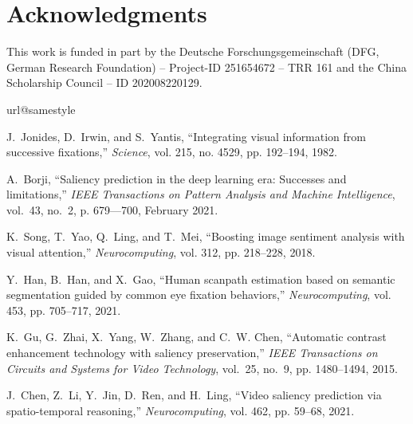 \documentclass{article}
\begin{document}
\section{Acknowledgments}

This work is funded in part by the Deutsche Forschungsgemeinschaft (DFG, German Research Foundation) – Project-ID 251654672 – TRR 161 and the China Scholarship Council – ID 202008220129.


\begin{thebibliography}{10}
\providecommand{\url}[1]{#1}
\csname url@samestyle\endcsname
\providecommand{\newblock}{\relax}
\providecommand{\bibinfo}[2]{#2}
\providecommand{\BIBentrySTDinterwordspacing}{\spaceskip=0pt\relax}
\providecommand{\BIBentryALTinterwordstretchfactor}{4}
\providecommand{\BIBentryALTinterwordspacing}{\spaceskip=\fontdimen2\font plus
\BIBentryALTinterwordstretchfactor\fontdimen3\font minus
  \fontdimen4\font\relax}
\providecommand{\BIBforeignlanguage}[2]{{\expandafter\ifx\csname l@#1\endcsname\relax
\typeout{** WARNING: IEEEtran.bst: No hyphenation pattern has been}\typeout{** loaded for the language `#1'. Using the pattern for}\typeout{** the default language instead.}\else
\language=\csname l@#1\endcsname
\fi
#2}}
\providecommand{\BIBdecl}{\relax}
\BIBdecl

J.~Jonides, D.~Irwin, and S.~Yantis, ``Integrating visual information from
  successive fixations,'' \emph{Science}, vol. 215, no. 4529, pp. 192--194,
  1982.

A.~Borji, ``Saliency prediction in the deep learning era: Successes and
  limitations,'' \emph{IEEE Transactions on Pattern Analysis and Machine
  Intelligence}, vol.~43, no.~2, p. 679—700, February 2021.

K.~Song, T.~Yao, Q.~Ling, and T.~Mei, ``Boosting image sentiment analysis with
  visual attention,'' \emph{Neurocomputing}, vol. 312, pp. 218--228, 2018.

Y.~Han, B.~Han, and X.~Gao, ``Human scanpath estimation based on semantic
  segmentation guided by common eye fixation behaviors,''
  \emph{Neurocomputing}, vol. 453, pp. 705--717, 2021.

K.~Gu, G.~Zhai, X.~Yang, W.~Zhang, and C.~W. Chen, ``Automatic contrast
  enhancement technology with saliency preservation,'' \emph{IEEE Transactions
  on Circuits and Systems for Video Technology}, vol.~25, no.~9, pp.
  1480--1494, 2015.

J.~Chen, Z.~Li, Y.~Jin, D.~Ren, and H.~Ling, ``Video saliency prediction via
  spatio-temporal reasoning,'' \emph{Neurocomputing}, vol. 462, pp. 59--68,
  2021.


\end{thebibliography}
\end{document}
